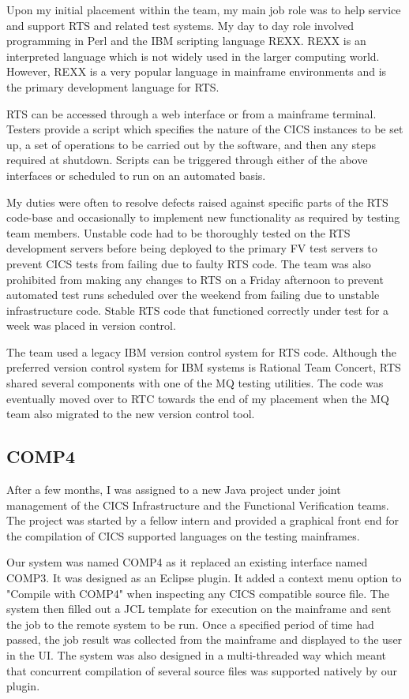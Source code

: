 \documentclass[12pt,a4paper]{article}
\begin{document}
Upon my initial placement within the team, my main job role was to help service
and support RTS and related test systems. My day to day role involved
programming in Perl and the IBM scripting language REXX. REXX is an interpreted
language which is not widely used in the larger computing world. However, REXX
is a very popular language in mainframe environments and is the primary
development language for RTS. 

RTS can be accessed through a web interface or from a mainframe terminal.
Testers provide a script which specifies the nature of the CICS instances to be
set up, a set of operations to be carried out by the software, and then any
steps required at shutdown. Scripts can be triggered through either of the above
interfaces or scheduled to run on an automated basis.

My duties were often to resolve defects raised against specific parts of the RTS
code-base and occasionally to implement new functionality as required by testing
team members. Unstable code had to be thoroughly tested on the RTS development
servers before being deployed to the primary FV test servers to prevent CICS
tests from failing due to faulty RTS code. The team was also prohibited from
making any changes to RTS on a Friday afternoon to prevent automated test runs
scheduled over the weekend from failing due to unstable infrastructure code.
Stable RTS code that functioned correctly under test for a week was placed in
version control.

The team used a legacy IBM version control system for RTS code. Although the
preferred version control system for IBM systems is Rational Team Concert, 
RTS shared several components with one of the MQ testing utilities. The code
was eventually moved over to RTC towards the end of my placement when the MQ
team also migrated to the new version control tool.

\subsection{COMP4}
After a few months, I was assigned to a new Java project under joint management
of the CICS Infrastructure and the Functional Verification teams. The project was
started by a fellow intern and provided a graphical front end for the compilation
of CICS supported languages on the testing mainframes. 

Our system was named COMP4 as it replaced an existing interface named COMP3. It was
designed as an Eclipse plugin. It added a context menu option to "Compile with
COMP4" when inspecting any CICS compatible source file. The system then filled
out a JCL template for execution on the mainframe and sent the job to the 
remote system to be run. Once a specified period of time had passed, the job 
result was collected from the mainframe and displayed to the user in the UI.
The system was also designed in a multi-threaded way which meant that concurrent
compilation of several source files was supported natively by our plugin.
\end{document}
